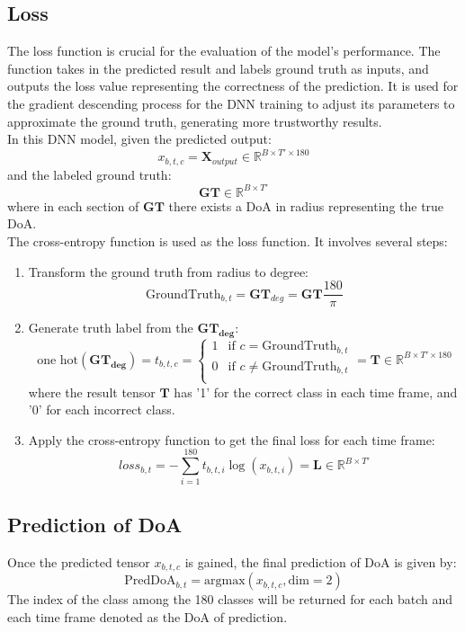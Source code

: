 \subsection*{Loss}
The loss function is crucial for the evaluation of the model's performance. The function takes in the predicted result and labels ground truth as inputs, and outputs the loss value representing the correctness of the prediction. It is used for the gradient descending process for the DNN training to adjust its parameters to approximate the ground truth, generating more trustworthy results.\\
In this DNN model, given the predicted output:
\[
    x_{b,t,c} = \mathbf{X}_{output} \in \mathbb{R}^{B \times T' \times 180} 
\]
and the labeled ground truth:
\[
    \mathbf{GT} \in \mathbb{R}^{B \times T'}
\]
where in each section of \(\mathbf{GT}\) there exists a DoA in radius representing the true DoA.\\
The cross-entropy function is used as the loss function. It involves several steps:
\begin{enumerate}
    \item Transform the ground truth from radius to degree:
    \[
        \text{GroundTruth}_{b,t} = \mathbf{GT}_{deg} = \mathbf{GT} \frac{180}{\pi}
    \]
    \item Generate truth label from the \(\mathbf{GT_{deg}}\):
    \[
        \text{one hot}(\mathbf{GT_{deg}}) = t_{b,t,c} = 
        \begin{cases}
        1 & \text{if } c = \text{GroundTruth}_{b,t}\\
        0 & \text{if } c \neq \text{GroundTruth}_{b,t}\\
        \end{cases}
        =\mathbf{T} \in \mathbb{R}^{B \times T' \times 180}
    \]
    where the result tensor \(\mathbf{T}\) has '1' for the correct class in each time frame, and '0' for each incorrect class.
    \item Apply the cross-entropy function to get the final loss for each time frame:
    \[
        loss_{b,t} = -\sum_{i = 1}^{180} t_{b,t,i} \log (x_{b,t,i}) = \mathbf{L} \in \mathbb{R}^{B \times T'}
    \]
\end{enumerate}

\subsection*{Prediction of DoA}
Once the predicted tensor \(x_{b,t,c}\) is gained, the final prediction of DoA is given by:
\[
    \text{PredDoA}_{b,t} = \text{argmax}(x_{b,t,c}, \text{dim} = 2)
\]
The index of the class among the 180 classes will be returned for each batch and each time frame denoted as the DoA of prediction.\\

